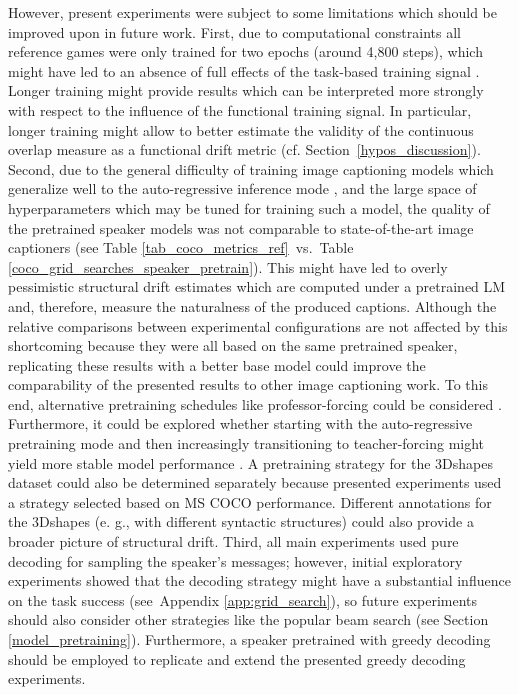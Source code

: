 However, present experiments were subject to some limitations which should be improved upon in future work. First, due to computational constraints all reference games were only trained for two epochs (around 4,800 steps), which might have led to an absence of full effects of the task-based training signal \parencite[compared to, e.g.,][who had 300,000 training steps]{lee2019countering}. Longer training might provide results which can be interpreted more strongly with respect to the influence of the functional training signal. In particular, longer training might allow to better estimate the validity of the continuous overlap measure as a functional drift metric (cf. Section~\ref{hypos_discussion}).
Second, due to the general difficulty of training image captioning models which generalize well to the auto-regressive inference mode \parencite{lamb2016professor}, and the large space of hyperparameters which may be tuned for training such a model, the quality of the pretrained speaker models was not comparable to state-of-the-art image captioners (see Table \ref{tab_coco_metrics_ref}~vs.~Table \ref{coco_grid_searches_speaker_pretrain}). This might have led to overly pessimistic structural drift estimates which are computed under a pretrained LM and, therefore, measure the naturalness of the produced captions. Although the relative comparisons between experimental configurations are not affected by this shortcoming because they were all based on the same pretrained speaker, replicating these results with a better base model could improve the comparability of the presented results to other image captioning work. To this end, alternative pretraining schedules like professor-forcing could be considered \parencite{lamb2016professor}. Furthermore, it could be explored whether starting with the auto-regressive pretraining mode and then increasingly transitioning to teacher-forcing might yield more stable model performance \parencite[although similar explorations by][suggest that this order might not work very well]{lowe2020interaction}. A pretraining strategy for the 3Dshapes dataset could also be determined separately because presented experiments used a strategy selected based on MS COCO performance. Different annotations for the 3Dshapes (e. g., with different syntactic structures) could also provide a broader picture of structural drift.
Third, all main experiments used pure decoding for sampling the speaker's messages; however, initial exploratory experiments showed that the decoding strategy might have a substantial influence on the task success (see~Appendix \ref{app:grid_search}), so future experiments should also consider other strategies like the popular beam search (see Section \ref{model_pretraining}). Furthermore, a speaker pretrained with greedy decoding should be employed to replicate and extend the presented greedy decoding experiments.
